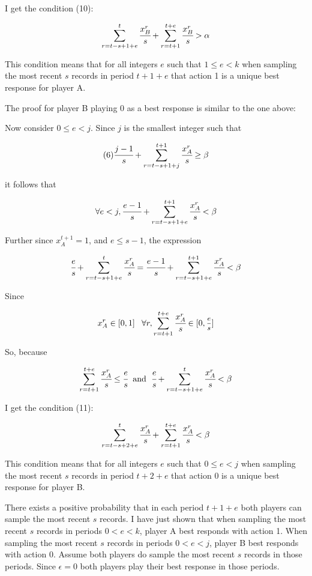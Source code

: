 \documentclass{article}
\begin{document}
I get the condition (10):

$$\sum\limits_{r=t-s+1+e}^{t}\cfrac{x^r_B}{s}+\sum\limits_{r=t+1}^{t+e} \cfrac{x^r_B}{s} > \alpha$$

This condition means that for all integers $e$ such that $1 \leq e<k$ when sampling the most recent $s$ records in period $t+1+e$ that action 1 is a unique best response for player A.

\vskip18pt

The proof for player B playing 0 as a best response is similar to the one above:

\vskip6pt

Now consider $0 \leq e<j$. Since $j$ is the smallest integer such that 

$$(6) \cfrac{j-1}{s}+\sum\limits_{r=t-s+1+j}^{t+1} \cfrac{x^r_A}{s} \geq \beta$$ 

it follows that

$$\forall e<j, \cfrac{e-1}{s}+\sum\limits_{r=t-s+1+e}^{t+1} \cfrac{x^r_A}{s} < \beta$$

Further since $x^{t+1}_A = 1$, and $e \leq s-1$, the expression

$$\cfrac{e}{s}+\sum\limits_{r=t-s+1+e}^{t} \cfrac{x^r_A}{s} = \cfrac{e-1}{s}+\sum\limits_{r=t-s+1+e}^{t+1} \cfrac{x^r_A}{s} < \beta$$

Since 

$$x_A^r \in [0,1] \hspace{8pt} \forall r, \sum\limits_{r=t+1}^{t+e} \cfrac{x^r_A}{s} \in [0,\mfrac{e}{s}]$$

So, because 

$$\sum\limits_{r=t+1}^{t+e} \cfrac{x^r_A}{s} \leq \cfrac{e}{s} \hspace{6pt} \text{and} \hspace{6pt} \cfrac{e}{s}+\sum\limits_{r=t-s+1+e}^{t} \cfrac{x^r_A}{s} < \beta$$ 

I get the condition (11):

$$\sum\limits_{r=t-s+2+e}^{t}\cfrac{x^r_A}{s}+\sum\limits_{r=t+1}^{t+e} \cfrac{x^r_A}{s} < \beta$$

This condition means that for all integers $e$ such that $0 \leq e<j$ when sampling the most recent $s$ records in period $t+2+e$ that action 0 is a unique best response for player B.

\vskip12pt

There exists a positive probability that in each period $t+1+e$ both players can sample the most recent $s$ records. I have just shown that when sampling the most recent $s$ records in periods $0 < e < k$, player A best responds with action 1. When sampling the most recent $s$ records in periods $0 < e < j$, player B best responds with action 0. Assume both players do sample the most recent $s$ records in those periods. Since $\epsilon=0$ both players play their best response in those periods.
\end{document}
